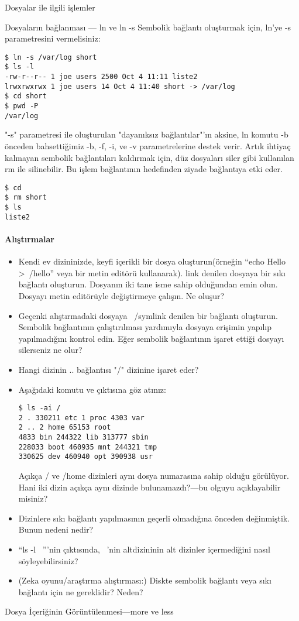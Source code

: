 \begin{section}{Dosyalar ile ilgili işlemler}
\begin{subsection}{Dosyaların bağlanması — ln ve ln -s}
Sembolik bağlantı oluşturmak için, ln'ye -s parametresini vermelisiniz:
\begin{verbatim}
$ ln -s /var/log short
$ ls -l
-rw-r--r-- 1 joe users 2500 Oct 4 11:11 liste2
lrwxrwxrwx 1 joe users 14 Oct 4 11:40 short -> /var/log
$ cd short
$ pwd -P
/var/log
\end{verbatim}
"-s" parametresi ile oluşturulan "dayanıksız bağlantılar"'ın aksine, ln komutu -b önceden bahsettiğimiz -b, -f, -i, ve -v parametrelerine destek verir. Artık ihtiyaç kalmayan sembolik bağlantıları kaldırmak için, düz dosyaları siler gibi kullanılan rm ile silinebilir. Bu işlem bağlantının hedefinden ziyade bağlantıya etki eder.
\begin{verbatim}
$ cd
$ rm short
$ ls
liste2
\end{verbatim}

\paragraph{Alıştırmalar}{
\begin{itemize}
 \item Kendi ev dizininizde, keyfi içerikli bir dosya oluşturun(örneğin “echo Hello >~/hello” veya bir metin editörü kullanarak). link denilen dosyaya bir sıkı bağlantı oluşturun. Dosyanın iki tane isme sahip olduğundan emin olun. Dosyayı metin editörüyle değiştirmeye çalışın. Ne oluşur?
 \item Geçenki alıştırmadaki dosyaya ~/symlink denilen bir bağlantı oluşturun. Sembolik bağlantının çalıştırılması yardımıyla dosyaya erişimin yapılıp yapılmadığını kontrol edin. Eğer sembolik bağlantının işaret ettiği dosyayı silerseniz ne olur?
 \item Hangi dizinin .. bağlantısı "/" dizinine işaret eder?
 \item Aşağıdaki komutu ve çıktısına göz atınız:\begin{verbatim}
$ ls -ai /
2 . 330211 etc 1 proc 4303 var
2 .. 2 home 65153 root
4833 bin 244322 lib 313777 sbin
228033 boot 460935 mnt 244321 tmp
330625 dev 460940 opt 390938 usr 
 \end{verbatim} Açıkça / ve /home dizinleri aynı dosya numarasına sahip olduğu görülüyor. Hani iki dizin açıkça aynı dizinde bulunamazdı?—bu olguyu açıklayabilir misiniz?
 \item Dizinlere sıkı bağlantı yapılmasının geçerli olmadığına önceden değinmiştik. Bunun nedeni nedir?
 \item “ls -l ~”'nin çıktısında, ~'nin altdizininin alt dizinler içermediğini nasıl söyleyebilirsiniz?
 \item (Zeka oyunu/araştırma alıştırması:) Diskte sembolik bağlantı veya sıkı bağlantı için ne gereklidir? Neden?
\end{itemize}}
\end{subsection}
\begin{subsection}{Dosya İçeriğinin Görüntülenmesi—more ve less}


\end{subsection}
\end{section}
